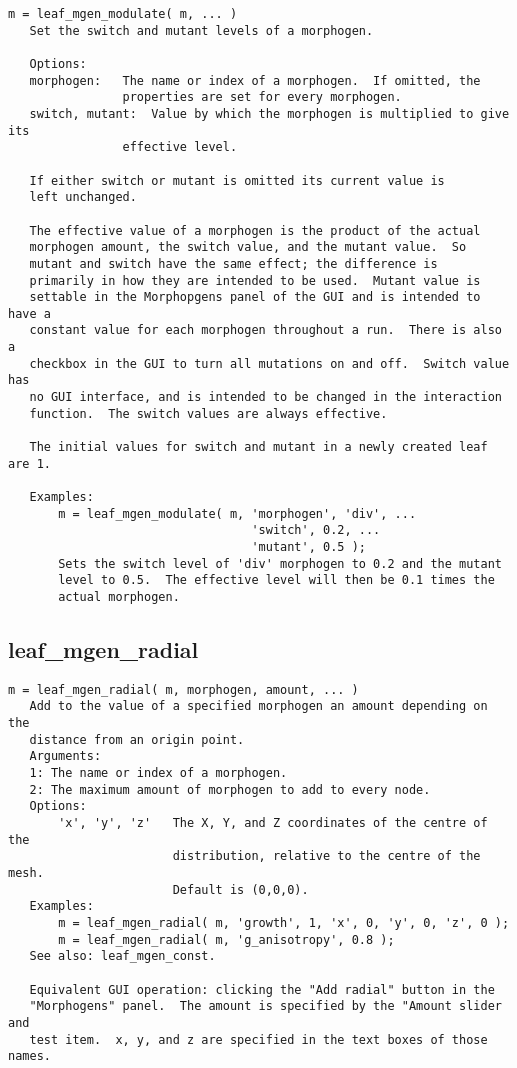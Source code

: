 \begin{verbatim}
m = leaf_mgen_modulate( m, ... )
   Set the switch and mutant levels of a morphogen.

   Options:
   morphogen:   The name or index of a morphogen.  If omitted, the
                properties are set for every morphogen.
   switch, mutant:  Value by which the morphogen is multiplied to give its
                effective level.

   If either switch or mutant is omitted its current value is
   left unchanged. 

   The effective value of a morphogen is the product of the actual
   morphogen amount, the switch value, and the mutant value.  So
   mutant and switch have the same effect; the difference is
   primarily in how they are intended to be used.  Mutant value is
   settable in the Morphopgens panel of the GUI and is intended to have a
   constant value for each morphogen throughout a run.  There is also a
   checkbox in the GUI to turn all mutations on and off.  Switch value has
   no GUI interface, and is intended to be changed in the interaction
   function.  The switch values are always effective.

   The initial values for switch and mutant in a newly created leaf are 1.

   Examples:
       m = leaf_mgen_modulate( m, 'morphogen', 'div', ...
                                  'switch', 0.2, ...
                                  'mutant', 0.5 );
       Sets the switch level of 'div' morphogen to 0.2 and the mutant
       level to 0.5.  The effective level will then be 0.1 times the
       actual morphogen.
\end{verbatim}

\subsection{leaf\_mgen\_radial}\label{section-leaf-mgen-radial}

\begin{verbatim}
m = leaf_mgen_radial( m, morphogen, amount, ... )
   Add to the value of a specified morphogen an amount depending on the
   distance from an origin point.
   Arguments:
   1: The name or index of a morphogen.
   2: The maximum amount of morphogen to add to every node.
   Options:
       'x', 'y', 'z'   The X, Y, and Z coordinates of the centre of the
                       distribution, relative to the centre of the mesh.
                       Default is (0,0,0).
   Examples:
       m = leaf_mgen_radial( m, 'growth', 1, 'x', 0, 'y', 0, 'z', 0 );
       m = leaf_mgen_radial( m, 'g_anisotropy', 0.8 );
   See also: leaf_mgen_const.

   Equivalent GUI operation: clicking the "Add radial" button in the
   "Morphogens" panel.  The amount is specified by the "Amount slider and
   test item.  x, y, and z are specified in the text boxes of those names.
\end{verbatim}

